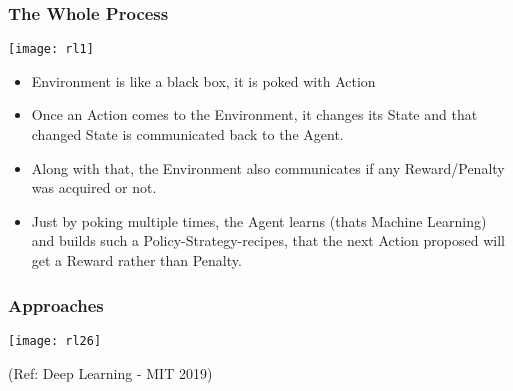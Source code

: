 \begin{frame}[fragile]\frametitle{The Whole Process}

\begin{center}
\texttt{[image: rl1]}
\end{center}

\begin{itemize}
\item Environment is like a black box, it is poked with Action
\item Once an Action comes to the Environment, it changes its State and that changed State is communicated back to the Agent.
\item Along with that, the Environment also communicates if any Reward/Penalty was acquired or not.
\item Just by poking multiple times, the Agent learns (thats Machine Learning) and builds such a Policy-Strategy-recipes, that the next Action proposed will get a Reward rather than Penalty.
\end{itemize}
\end{frame}


\begin{frame}[fragile]\frametitle{Approaches}
\begin{center}
\texttt{[image: rl26]}
\end{center}

{\tiny (Ref: Deep Learning - MIT 2019)}

\end{frame}



